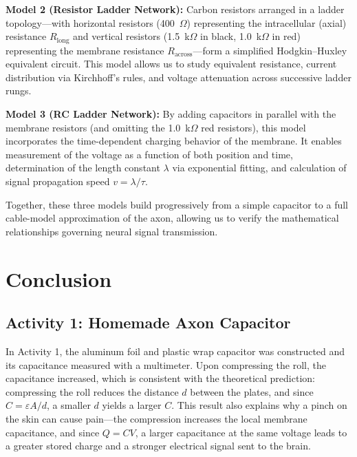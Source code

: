 \message{ !name(lab_report.tex)}\documentclass[12pt]{article}
\begin{document}
\textbf{Model 2 (Resistor Ladder Network):} Carbon resistors arranged in a ladder topology---with horizontal resistors (400~$\Omega$) representing the intracellular (axial) resistance $R_{\text{long}}$ and vertical resistors (1.5~k$\Omega$ in black, 1.0~k$\Omega$ in red) representing the membrane resistance $R_{\text{across}}$---form a simplified Hodgkin--Huxley equivalent circuit. This model allows us to study equivalent resistance, current distribution via Kirchhoff's rules, and voltage attenuation across successive ladder rungs.

\textbf{Model 3 (RC Ladder Network):} By adding capacitors in parallel with the membrane resistors (and omitting the 1.0~k$\Omega$ red resistors), this model incorporates the time-dependent charging behavior of the membrane. It enables measurement of the voltage as a function of both position and time, determination of the length constant $\lambda$ via exponential fitting, and calculation of signal propagation speed $v = \lambda/\tau$.

Together, these three models build progressively from a simple capacitor to a full cable-model approximation of the axon, allowing us to verify the mathematical relationships governing neural signal transmission.

\section{Conclusion}

\subsection{Activity 1: Homemade Axon Capacitor}

In Activity 1, the aluminum foil and plastic wrap capacitor was constructed and its capacitance measured with a multimeter. Upon compressing the roll, the capacitance increased, which is consistent with the theoretical prediction: compressing the roll reduces the distance $d$ between the plates, and since $C = \varepsilon A / d$, a smaller $d$ yields a larger $C$. This result also explains why a pinch on the skin can cause pain---the compression increases the local membrane capacitance, and since $Q = CV$, a larger capacitance at the same voltage leads to a greater stored charge and a stronger electrical signal sent to the brain.
\end{document}
